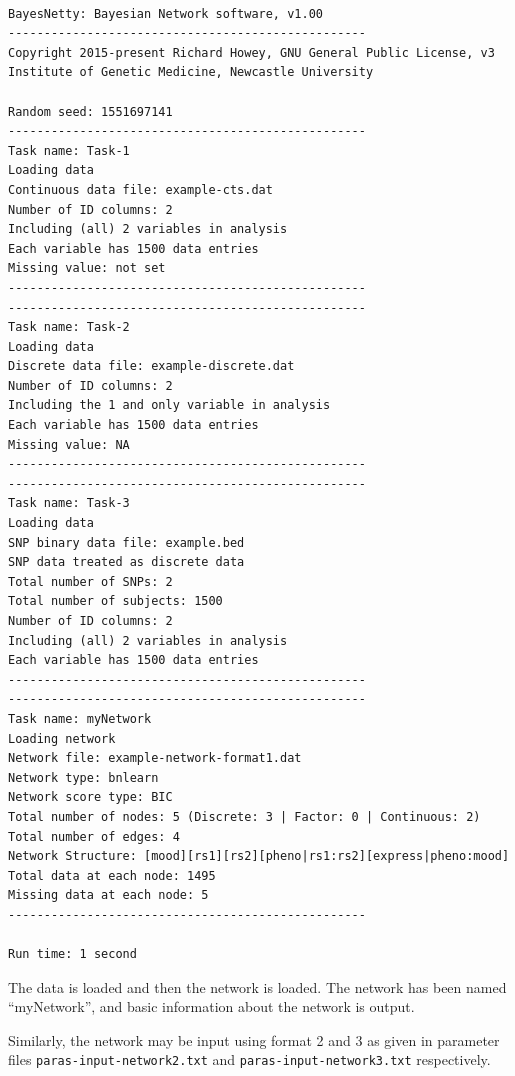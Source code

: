\documentclass[a4paper,12pt]{article}
\newcommand{\code}[1]{{\footnotesize{{\tt #1}}}}
\begin{document}
\vspace{0.35cm} \begin{lstlisting}

BayesNetty: Bayesian Network software, v1.00
--------------------------------------------------
Copyright 2015-present Richard Howey, GNU General Public License, v3
Institute of Genetic Medicine, Newcastle University

Random seed: 1551697141
--------------------------------------------------
Task name: Task-1
Loading data
Continuous data file: example-cts.dat
Number of ID columns: 2
Including (all) 2 variables in analysis
Each variable has 1500 data entries
Missing value: not set
--------------------------------------------------
--------------------------------------------------
Task name: Task-2
Loading data
Discrete data file: example-discrete.dat
Number of ID columns: 2
Including the 1 and only variable in analysis
Each variable has 1500 data entries
Missing value: NA
--------------------------------------------------
--------------------------------------------------
Task name: Task-3
Loading data
SNP binary data file: example.bed
SNP data treated as discrete data
Total number of SNPs: 2
Total number of subjects: 1500
Number of ID columns: 2
Including (all) 2 variables in analysis
Each variable has 1500 data entries
--------------------------------------------------
--------------------------------------------------
Task name: myNetwork
Loading network
Network file: example-network-format1.dat
Network type: bnlearn
Network score type: BIC
Total number of nodes: 5 (Discrete: 3 | Factor: 0 | Continuous: 2)
Total number of edges: 4
Network Structure: [mood][rs1][rs2][pheno|rs1:rs2][express|pheno:mood]
Total data at each node: 1495
Missing data at each node: 5
--------------------------------------------------

Run time: 1 second

\end{lstlisting} \vspace{0.35cm}
The data is loaded and then the network is loaded. The network has been named ``myNetwork'', and basic information about the network is output. 

Similarly, the network may be input using format 2 and 3 as given in parameter files \code{paras-input-network2.txt} and \code{paras-input-network3.txt} respectively. 



\end{document}
